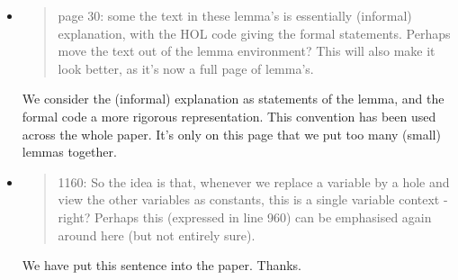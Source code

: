 \begin{itemize}

  \item \begin{quote}
page 30: some the text in these lemma's is essentially (informal) explanation, with the HOL code giving the formal statements. Perhaps move the text out of the lemma environment? This will also make it look better, as it's now a full page of lemma's. 
\end{quote}
  \Mark We consider the (informal) explanation as statements of the
  lemma, and the formal code a more rigorous representation. This
  convention has been used across the whole paper. It's only on this
  page that we put too many (small) lemmas together.


  \item \begin{quote}
1160: So the idea is that, whenever we replace a variable by a hole and view the other variables as constants, this is a single variable context - right? Perhaps this (expressed in line 960) can be emphasised again around here (but not entirely sure). 
\end{quote}
  \Mark We have put this sentence into the paper. Thanks.






\end{itemize}
